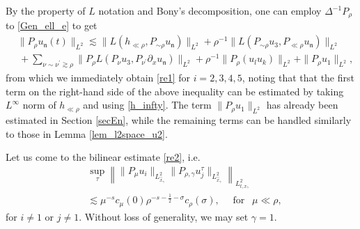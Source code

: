 \documentclass[11pt,letterpaper,reqno]{amsart}
\numberwithin{equation}{section}
\theoremstyle{definition}
\theoremstyle{remark}
\begin{document}
By the property of \(L\) notation and Bony's decomposition, one can employ $\Delta^{-1} P_\rho  $ to \eqref{Gen_ell_e} to  get
\begin{align*}
   & 	\|P_{\rho} u_{\mathfrak{n}}(t) \|_{L^2}\lesssim    \| L(h_{\ll  \rho}, P_{ \sim \rho} u_{\mathfrak{n}} )\|_{L^2}+  \rho^{-1} \|L(P_{\sim \rho } u_3, P_{\ll\rho } u_{\mathfrak{n}})\|_{L^2}\\
    &\,  + \sum_{\nu\sim \nu^\prime \gtrsim \rho}  \|P_\rho L (P_\nu u_3, P_{\nu^\prime} \partial_x u_{\mathfrak{n}} )\|_{L^2}+  \rho^{-1} \|P_\rho\left ( u_l   u_{k}\right)\|_{L^2}  +\| P_\rho u_1 \|_{L^2},
\end{align*}
from which we immediately obtain \eqref{re1} for $ i=2,3,4,5 $, noting that   that the first term on the right-hand side of the above inequality can be estimated by taking \(L^\infty\)  norm of  \( h_{\ll  \rho}\) and using \eqref{h_infty}. The term \( \| P_\rho  u_1 \|_{L^2} \) has already been estimated in Section \ref{secEn}, while the remaining terms can be handled similarly to those in Lemma \ref{lem_l2space_u2}. 

Let us come to the bilinear estimate \eqref{re2}, i.e.
\begin{align}
	&\sup_{\tau} \left\| \|P_\mu u_{i}\|_{L^2_{\widehat{x}_\gamma}}  \|  P_{\rho, \gamma} u_{j}^\tau\|_{L^2_{\widehat{x}_\gamma}}  \right\|_{L^2_{t,x_\gamma}}  \label{bieI_neq1} \\
	&\lesssim \mu^{-s} c_\mu(0) \rho^{-s-\frac 12-\sigma} c_\rho(\sigma), \quad  	\text{ for } ~~\mu\ll \rho, \nonumber
\end{align}
for $i\neq 1 $ or $ j\neq 1. $   Without loss of generality, we may set  $ \gamma=1 $. 
\end{document}
